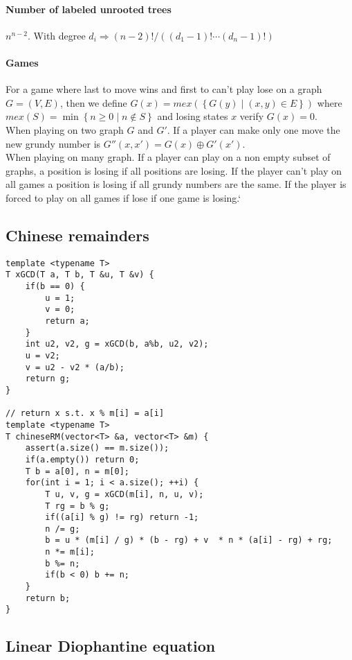 \documentclass[a4paper,9pt]{article}
\begin{document}
\paragraph{Number of labeled unrooted trees} $n^{n-2}$. With degree $d_i \Rightarrow (n-2)!/\left( (d_1-1)! \cdots (d_n-1)! \right)$

\paragraph{Games}

For a game where last to move wins and first to can't play lose on a graph $G=(V,E)$, then we define $G(x) = mex \left( \left\{ G(y) \mid (x, y) \in E \right\} \right)$ where $mex \left( S \right) = \min \left\{ n \geqslant 0 \mid n \not \in S \right\}$ and losing states $x$ verify $G(x)=0$. \\
When playing on two graph $G$ and $G'$. If a player can make only one move the new grundy number is $G''(x, x') = G(x) \oplus G'(x')$. \\
When playing on many graph. If a player can play on a non empty subset of graphs, a position is losing if all positions are losing. If the player can't play on all games a position is losing if all grundy numbers are the same. If the player is forced to play on all games if lose if one game is losing.` \\

\subsection{Chinese remainders}

\begin{lstlisting}
template <typename T>
T xGCD(T a, T b, T &u, T &v) {
	if(b == 0) {
		u = 1;
		v = 0;
		return a;
	}
	int u2, v2, g = xGCD(b, a%b, u2, v2);
	u = v2;
	v = u2 - v2 * (a/b);
	return g;
}

// return x s.t. x % m[i] = a[i]
template <typename T>
T chineseRM(vector<T> &a, vector<T> &m) {
	assert(a.size() == m.size());
	if(a.empty()) return 0;
	T b = a[0], n = m[0];
	for(int i = 1; i < a.size(); ++i) {
		T u, v, g = xGCD(m[i], n, u, v);
		T rg = b % g;
		if((a[i] % g) != rg) return -1;
		n /= g;
		b = u * (m[i] / g) * (b - rg) + v  * n * (a[i] - rg) + rg;
		n *= m[i];
		b %= n;
		if(b < 0) b += n;
	}
	return b;
}
\end{lstlisting}

\subsection{Linear Diophantine equation}
\end{document}
